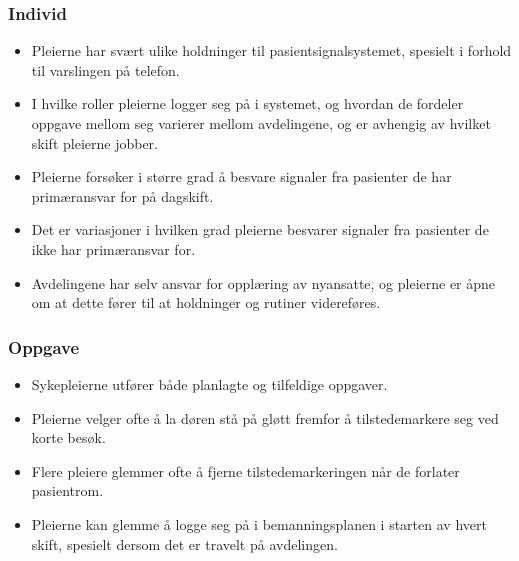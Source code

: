 \subsubsection{Individ}
\begin{itemize}
\item Pleierne har svært ulike holdninger til pasientsignalsystemet, spesielt i forhold til varslingen på telefon.

\item I hvilke roller pleierne logger seg på i systemet, og hvordan de fordeler oppgave mellom seg varierer mellom avdelingene, og er avhengig av hvilket skift pleierne jobber.

\item Pleierne forsøker i større grad å besvare signaler fra pasienter de har primæransvar for på dagskift.

\item Det er variasjoner i hvilken grad pleierne besvarer signaler fra pasienter de ikke har primæransvar for.

\item Avdelingene har selv ansvar for opplæring av nyansatte, og pleierne er åpne om at dette fører til at holdninger og rutiner videreføres.

\end{itemize}

\subsubsection{Oppgave}
\begin{itemize}
\item Sykepleierne utfører både planlagte og tilfeldige oppgaver.

\item Pleierne velger ofte å la døren stå på gløtt fremfor å tilstedemarkere seg ved korte besøk. 

\item Flere pleiere glemmer ofte å fjerne tilstedemarkeringen når de forlater pasientrom.

\item Pleierne kan glemme å logge seg på i bemanningsplanen i starten av hvert skift, spesielt dersom det er travelt på avdelingen.
\end{itemize}



